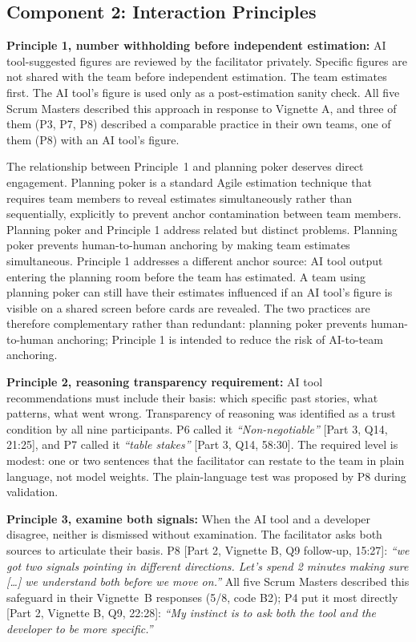 \documentclass[a4paper,twoside]{bth}
\begin{document}
\subsection{Component 2: Interaction Principles}

\textbf{Principle 1, number withholding before independent estimation:} AI tool-suggested figures are reviewed by the facilitator privately. Specific figures are not shared with the team before independent estimation. The team estimates first. The AI tool's figure is used only as a post-estimation sanity check. All five Scrum Masters described this approach in response to Vignette A, and three of them (P3, P7, P8) described a comparable practice in their own teams, one of them (P8) with an AI tool's figure.

The relationship between Principle~1 and planning poker deserves direct engagement. Planning poker is a standard Agile estimation technique that requires team members to reveal estimates simultaneously rather than sequentially, explicitly to prevent anchor contamination between team members. Planning poker and Principle 1 address related but distinct problems. Planning poker prevents human-to-human anchoring by making team estimates simultaneous. Principle 1 addresses a different anchor source: AI tool output entering the planning room before the team has estimated. A team using planning poker can still have their estimates influenced if an AI tool's figure is visible on a shared screen before cards are revealed. The two practices are therefore complementary rather than redundant: planning poker prevents human-to-human anchoring; Principle 1 is intended to reduce the risk of AI-to-team anchoring.

\textbf{Principle 2, reasoning transparency requirement:} AI tool recommendations must include their basis: which specific past stories, what patterns, what went wrong. Transparency of reasoning was identified as a trust condition by all nine participants. P6 called it \textit{``Non-negotiable''} [Part 3, Q14, 21:25], and P7 called it \textit{``table stakes''} [Part 3, Q14, 58:30]. The required level is modest: one or two sentences that the facilitator can restate to the team in plain language, not model weights. The plain-language test was proposed by P8 during validation.

\textbf{Principle 3, examine both signals:} When the AI tool and a developer disagree, neither is dismissed without examination. The facilitator asks both sources to articulate their basis. P8 [Part 2, Vignette B, Q9 follow-up, 15:27]: \textit{``we got two signals pointing in different directions. Let's spend 2 minutes making sure {[}\ldots{]} we understand both before we move on.''} All five Scrum Masters described this safeguard in their Vignette~B responses (5/8, code B2); P4 put it most directly [Part 2, Vignette B, Q9, 22:28]: \textit{``My instinct is to ask both the tool and the developer to be more specific.''}
\end{document}
